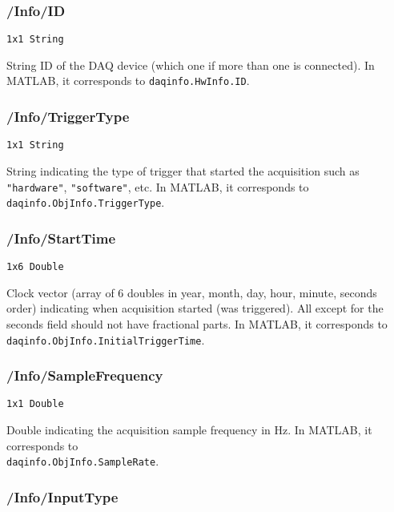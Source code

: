\documentclass[12pt]{article} %
\begin{document}
\subsubsection{/Info/ID}

\verb|1x1 String|

String ID of the DAQ device (which one if more than one is connected).
In MATLAB\textsuperscript{\textregistered}, it corresponds to \verb|daqinfo.HwInfo.ID|.



\subsubsection{/Info/TriggerType}

\verb|1x1 String|

String indicating the type of trigger that started the acquisition such as \verb|"hardware"|, \verb|"software"|, etc.
In MATLAB\textsuperscript{\textregistered}, it corresponds to \verb|daqinfo.ObjInfo.TriggerType|.



\subsubsection{/Info/StartTime}

\verb|1x6 Double|

Clock vector (array of 6 doubles in year, month, day, hour, minute, seconds order) indicating when acquisition started (was triggered).
All except for the seconds field should not have fractional parts.
In MATLAB\textsuperscript{\textregistered}, it corresponds to \\ \verb|daqinfo.ObjInfo.InitialTriggerTime|.



\subsubsection{/Info/SampleFrequency}

\verb|1x1 Double|

Double indicating the acquisition sample frequency in Hz.
In MATLAB\textsuperscript{\textregistered}, it corresponds to \\ \verb|daqinfo.ObjInfo.SampleRate|.



\subsubsection{/Info/InputType}
\end{document}
